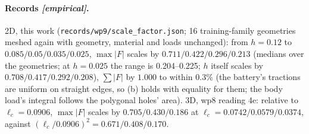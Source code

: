 \paragraph{Records \emph{[empirical]}.} 2D, this work
(\texttt{records/wp9/scale\_factor.json}; 16 training-family geometries meshed
again with geometry, material and loads unchanged): from $h = 0.12$ to $0.085
/ 0.05 / 0.035 / 0.025$, $\max|F|$ scales by $0.711 / 0.422 / 0.296 / 0.213$
(medians over the geometries; at $h = 0.025$ the range is 0.204--0.225; $h$
itself scales by $0.708 / 0.417 / 0.292 / 0.208$), $\sum|F|$ by $1.000$ to
within $0.3\%$ (the battery's tractions are uniform on straight edges, so (b) holds
with equality for them; the body load's integral follows the polygonal holes'
area). 3D, wp8 reading 4e: relative to $\ell_c = 0.0906$, $\max|F|$ scales by
$0.705 / 0.430 / 0.186$ at $\ell_c = 0.0742 / 0.0579 / 0.0374$, against
$(\ell_c / 0.0906)^2 = 0.671 / 0.408 / 0.170$.
